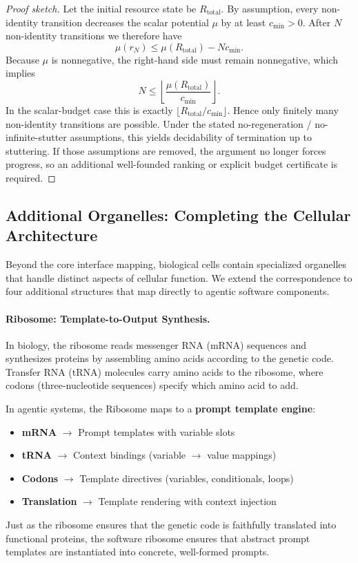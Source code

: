 \begin{proof}[Proof sketch]
Let the initial resource state be $R_{\mathrm{total}}$. By assumption, every non-identity transition decreases the scalar potential $\mu$ by at least $c_{\min} > 0$. After $N$ non-identity transitions we therefore have
\[
\mu(r_N) \le \mu(R_{\mathrm{total}}) - N c_{\min}.
\]
Because $\mu$ is nonnegative, the right-hand side must remain nonnegative, which implies
\[
N \le \left\lfloor \frac{\mu(R_{\mathrm{total}})}{c_{\min}} \right\rfloor.
\]
In the scalar-budget case this is exactly $\lfloor R_{\mathrm{total}} / c_{\min} \rfloor$. Hence only finitely many non-identity transitions are possible. Under the stated no-regeneration / no-infinite-stutter assumptions, this yields decidability of termination up to stuttering. If those assumptions are removed, the argument no longer forces progress, so an additional well-founded ranking or explicit budget certificate is required.
\end{proof}

\subsection{Additional Organelles: Completing the Cellular Architecture}

Beyond the core interface mapping, biological cells contain specialized organelles that handle distinct aspects of cellular function. We extend the correspondence to four additional structures that map directly to agentic software components.

\paragraph{Ribosome: Template-to-Output Synthesis.}
In biology, the ribosome reads messenger RNA (mRNA) sequences and synthesizes proteins by assembling amino acids according to the genetic code. Transfer RNA (tRNA) molecules carry amino acids to the ribosome, where codons (three-nucleotide sequences) specify which amino acid to add.

In agentic systems, the Ribosome maps to a \textbf{prompt template engine}:
\begin{itemize}[leftmargin=*]
\item \textbf{mRNA} $\to$ Prompt templates with variable slots
\item \textbf{tRNA} $\to$ Context bindings (variable $\to$ value mappings)
\item \textbf{Codons} $\to$ Template directives (variables, conditionals, loops)
\item \textbf{Translation} $\to$ Template rendering with context injection
\end{itemize}
Just as the ribosome ensures that the genetic code is faithfully translated into functional proteins, the software ribosome ensures that abstract prompt templates are instantiated into concrete, well-formed prompts.


